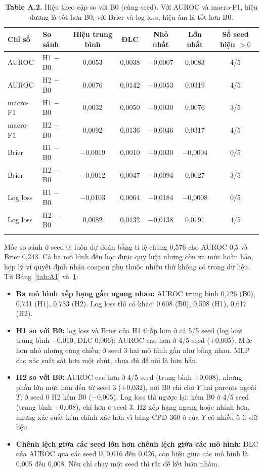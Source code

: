 \documentclass[pdflatex,sn-mathphys-num]{sn-jnl}%
\begin{document}
\begin{table}[t]
\caption{\textbf{Table A.2.} Hiệu theo cặp so với B0 (cùng seed). Với AUROC và macro-F1, hiệu dương là tốt hơn B0; với Brier và log loss, hiệu âm là tốt hơn B0.}\label{tab:A2}
\begin{tabular}{@{}llccccc@{}}
\toprule
Chỉ số & So sánh & Hiệu trung bình & ĐLC & Nhỏ nhất & Lớn nhất & Số seed hiệu $>0$ \\
\midrule
AUROC & H1 $-$ B0 & 0,0053 & 0,0038 & $-$0,0007 & 0,0083 & 4/5 \\
AUROC & H2 $-$ B0 & 0,0076 & 0,0142 & $-$0,0053 & 0,0319 & 4/5 \\
macro-F1 & H1 $-$ B0 & 0,0032 & 0,0050 & $-$0,0030 & 0,0076 & 3/5 \\
macro-F1 & H2 $-$ B0 & 0,0092 & 0,0136 & $-$0,0046 & 0,0317 & 4/5 \\
Brier & H1 $-$ B0 & $-$0,0019 & 0,0010 & $-$0,0030 & $-$0,0004 & 0/5 \\
Brier & H2 $-$ B0 & $-$0,0012 & 0,0047 & $-$0,0094 & 0,0027 & 3/5 \\
Log loss & H1 $-$ B0 & $-$0,0103 & 0,0064 & $-$0,0184 & $-$0,0008 & 0/5 \\
Log loss & H2 $-$ B0 & 0,0082 & 0,0132 & $-$0,0138 & 0,0191 & 4/5 \\
\botrule
\end{tabular}
\end{table}

Mốc so sánh ở seed 0: luôn dự đoán bằng tỉ lệ chung 0,576 cho AUROC 0,5 và Brier 0,243. Cả ba mô hình đều học được quy luật nhưng còn xa mức hoàn hảo, hợp lý vì quyết định nhận coupon phụ thuộc nhiều thứ không có trong dữ liệu. Từ Bảng~\ref{tab:A1} và~\ref{tab:A2}:

\begin{itemize}
\item \textbf{Ba mô hình xếp hạng gần ngang nhau:} AUROC trung bình 0,726 (B0), 0,731 (H1), 0,733 (H2). Log loss thì có khác: 0,608 (B0), 0,598 (H1), 0,617 (H2).
\item \textbf{H1 so với B0:} log loss và Brier của H1 thấp hơn ở cả 5/5 seed (log loss trung bình $-$0,010, ĐLC 0,006); AUROC cao hơn ở 4/5 seed (+0,005). Mức hơn nhỏ nhưng cùng chiều; ở seed 3 hai mô hình gần như bằng nhau. MLP cho xác suất sát hơn một chút, chưa đủ để nói là hơn hẳn.
\item \textbf{H2 so với B0:} AUROC cao hơn ở 4/5 seed (trung bình +0,008), nhưng phần lớn mức hơn đến từ seed 3 (+0,032), nơi B0 chỉ cho $Y$ hai parents ngoài $T$; ở seed 0 H2 kém B0 ($-$0,005). Log loss thì ngược lại: kém B0 ở 4/5 seed (trung bình +0,008), chỉ hơn ở seed 3. H2 xếp hạng ngang hoặc nhỉnh hơn, nhưng xác suất kém chính xác hơn vì bảng CPD 360 ô của $Y$ có nhiều ô ít dữ liệu.
\item \textbf{Chênh lệch giữa các seed lớn hơn chênh lệch giữa các mô hình:} ĐLC của AUROC qua các seed là 0,016 đến 0,026, còn hiệu giữa các mô hình là 0,005 đến 0,008. Nếu chỉ chạy một seed thì rất dễ kết luận nhầm.
\end{itemize}
\end{document}
